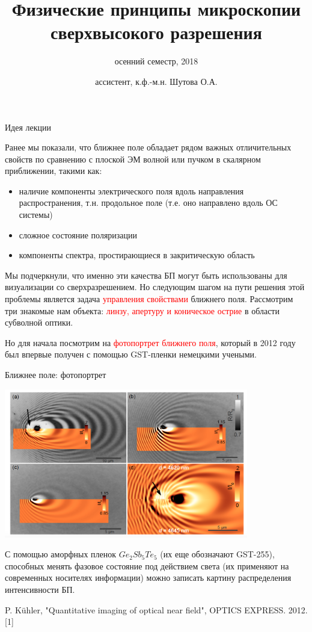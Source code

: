 \documentclass[9pt, compress, xcolor=table]{beamer}
\title{Физические принципы микроскопии сверхвысокого разрешения}
\subtitle{осенний семестр, 2018}
\author{ассистент, к.ф.-м.н. Шутова О.А.}
\institute{МГУ им. М.В. Ломоносова, физический факультет}
\begin{document}
\enablehyphenation

\maketitle


\begin{frame}{Идея лекции}

Ранее мы показали, что ближнее поле обладает рядом важных отличительных свойств по сравнению с плоской ЭМ волной или пучком в скалярном  приближении, такими как:
\begin{itemize}
\item наличие компоненты электрического поля вдоль направления распространения, т.н. продольное поле (т.е. оно направлено вдоль ОС системы)
\item сложное состояние поляризации
\item компоненты спектра, простирающиеся в закритическую область
\end{itemize}

Мы подчеркнули, что именно эти качества БП могут быть использованы для визуализации со сверхразрешением. Но следующим шагом на пути решения этой проблемы является задача \textcolor{red}{управления свойствами} ближнего поля. Рассмотрим три знакомые нам объекта: \textcolor{red}{линзу, апертуру и коническое острие} в области субволной оптики.

Но для начала посмотрим на \textcolor{red}{фотопортрет ближнего поля}, который в 2012 году был впервые получен с помощью GST-пленки немецкими учеными.

\end{frame}

\begin{frame}{Ближнее поле: фотопортрет}

\begin{center}
\includegraphics[width=0.8\textwidth]{near-field2}
\end{center}

С помощью аморфных пленок $Ge_2 Sb_5 Te_5$ (их еще обозначают GST-255), способных менять фазовое состояние под действием света (их применяют на современных носителях информации) можно записать картину распределения интенсивности БП.

\scriptsize{P. K\"uhler, "Quantitative imaging of optical near field", OPTICS EXPRESS. 2012. [1]}
\end{frame}
\end{document}

